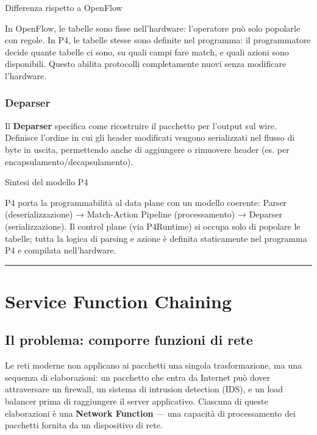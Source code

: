 \documentclass[
  italian,
  openany]{book}
\begin{document}
\begin{calloutnote}{Differenza rispetto a OpenFlow}

In OpenFlow, le tabelle sono fisse nell'hardware: l'operatore può solo
popolarle con regole. In P4, le tabelle stesse sono definite nel
programma: il programmatore decide quante tabelle ci sono, su quali
campi fare match, e quali azioni sono disponibili. Questo abilita
protocolli completamente nuovi senza modificare l'hardware.

\end{calloutnote}

\subsubsection{Deparser}\label{deparser}

Il \textbf{Deparser} specifica come ricostruire il pacchetto per
l'output sul wire. Definisce l'ordine in cui gli header modificati
vengono serializzati nel flusso di byte in uscita, permettendo anche di
aggiungere o rimuovere header (es. per encapsulamento/decapsulamento).

\begin{calloutnote}{Sintesi del modello P4}

P4 porta la programmabilità al data plane con un modello coerente:
Parser (deserializzazione) → Match-Action Pipeline (processamento) →
Deparser (serializzazione). Il control plane (via P4Runtime) si occupa
solo di popolare le tabelle; tutta la logica di parsing e azione è
definita staticamente nel programma P4 e compilata nell'hardware.

\end{calloutnote}

\begin{center}\rule{0.5\linewidth}{0.5pt}\end{center}

\section{Service Function Chaining}\label{service-function-chaining}

\subsection{Il problema: comporre funzioni di
rete}\label{il-problema-comporre-funzioni-di-rete}

Le reti moderne non applicano ai pacchetti una singola trasformazione,
ma una sequenza di elaborazioni: un pacchetto che entra da Internet può
dover attraversare un firewall, un sistema di intrusion detection (IDS),
e un load balancer prima di raggiungere il server applicativo. Ciascuna
di queste elaborazioni è una \textbf{Network Function} --- una capacità
di processamento dei pacchetti fornita da un dispositivo di rete.
\end{document}
